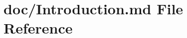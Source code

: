 \hypertarget{_introduction_8md}{\section{doc/\-Introduction.md File Reference}
\label{_introduction_8md}
}
